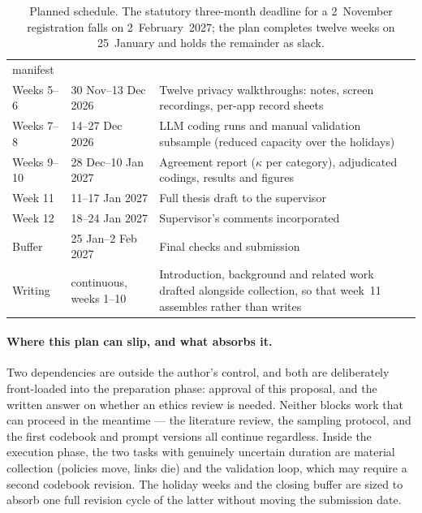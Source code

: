 \begin{table}[!ht]
\begin{tabularx}{\textwidth}{@{}llX@{}}
                                     manifest \\
Weeks 5--6   & 30 Nov--13 Dec 2026 & Twelve privacy walkthroughs: notes,
                                     screen recordings, per-app record sheets \\
Weeks 7--8   & 14--27 Dec 2026     & LLM coding runs and manual validation
                                     subsample (reduced capacity over the
                                     holidays) \\
Weeks 9--10  & 28 Dec--10 Jan 2027 & Agreement report ($\kappa$ per category),
                                     adjudicated codings, results and figures \\
Week 11      & 11--17 Jan 2027     & Full thesis draft to the supervisor \\
Week 12      & 18--24 Jan 2027     & Supervisor's comments incorporated \\
Buffer       & 25 Jan--2 Feb 2027  & Final checks and submission \\
\addlinespace
Writing      & continuous, weeks 1--10 & Introduction, background and related
                                         work drafted alongside collection, so
                                         that week~11 assembles rather than
                                         writes \\
\bottomrule
\end{tabularx}
\caption{Planned schedule. The statutory three-month deadline for a 2~November
registration falls on 2~February~2027; the plan completes twelve weeks on
25~January and holds the remainder as slack.}
\label{tab:timeline}
\end{table}

\paragraph{Where this plan can slip, and what absorbs it.}
Two dependencies are outside the author's control, and both are deliberately
front-loaded into the preparation phase: approval of this proposal, and the
written answer on whether an ethics review is needed. Neither blocks work that
can proceed in the meantime --- the literature review, the sampling protocol,
and the first codebook and prompt versions all continue regardless. Inside the
execution phase, the two tasks with genuinely uncertain duration are material
collection (policies move, links die) and the validation loop, which may require
a second codebook revision. The holiday weeks and the closing buffer are sized
to absorb one full revision cycle of the latter without moving the submission
date.
